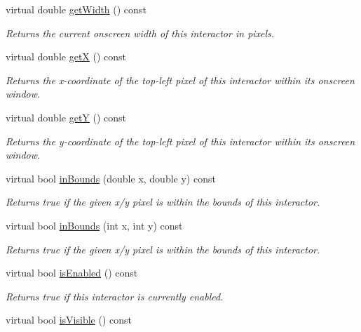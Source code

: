 \begin{DoxyCompactItemize}
virtual double \mbox{\hyperlink{classsgl_1_1GInteractor_a0ed2965abd4f5701d2cadf71239faf19}{get\+Width}} () const
\begin{DoxyCompactList}\small\item\em Returns the current onscreen width of this interactor in pixels. \end{DoxyCompactList}\item 
virtual double \mbox{\hyperlink{classsgl_1_1GInteractor_a344385751bee0720059403940d57a13e}{getX}} () const
\begin{DoxyCompactList}\small\item\em Returns the x-\/coordinate of the top-\/left pixel of this interactor within its onscreen window. \end{DoxyCompactList}\item 
virtual double \mbox{\hyperlink{classsgl_1_1GInteractor_aafa51c7f8f38a09febbb9ce7853f77b4}{getY}} () const
\begin{DoxyCompactList}\small\item\em Returns the y-\/coordinate of the top-\/left pixel of this interactor within its onscreen window. \end{DoxyCompactList}\item 
virtual bool \mbox{\hyperlink{classsgl_1_1GInteractor_afc480f652b8c5f1fb255e2269ce68879}{in\+Bounds}} (double x, double y) const
\begin{DoxyCompactList}\small\item\em Returns true if the given x/y pixel is within the bounds of this interactor. \end{DoxyCompactList}\item 
virtual bool \mbox{\hyperlink{classsgl_1_1GInteractor_ae6d7982c1c627b677a5e776ca86118ed}{in\+Bounds}} (int x, int y) const
\begin{DoxyCompactList}\small\item\em Returns true if the given x/y pixel is within the bounds of this interactor. \end{DoxyCompactList}\item 
virtual bool \mbox{\hyperlink{classsgl_1_1GInteractor_aacb819fb241851fd9fc045271baa4034}{is\+Enabled}} () const
\begin{DoxyCompactList}\small\item\em Returns true if this interactor is currently enabled. \end{DoxyCompactList}\item 
virtual bool \mbox{\hyperlink{classsgl_1_1GInteractor_a9d8a6cfb13917785c143e74d40e4e2be}{is\+Visible}} () const

\end{DoxyCompactItemize}
